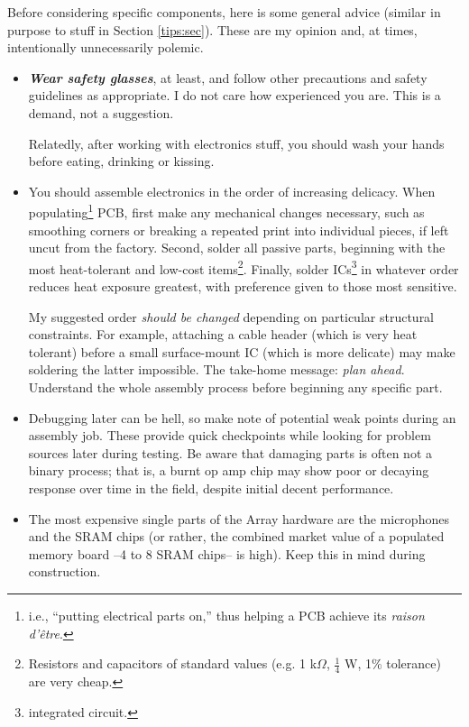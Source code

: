 \documentclass[letterpaper]{article}
\begin{document}
Before considering specific components, here is some general advice
(similar in purpose to stuff in Section \ref{tips:sec}). These are my
opinion and, at times, intentionally unnecessarily polemic.
\begin{itemize}
\item {\large \textbf{\textit{Wear safety glasses}}, at least, and
  follow other precautions and safety guidelines as appropriate.} I do
  not care how experienced you are. This is a demand, not a suggestion.

Relatedly, after working with electronics stuff, you should wash your
hands before eating, drinking or kissing.

\item You should assemble electronics in the order of increasing
  delicacy. When populating\footnote{i.e., ``putting electrical parts
    on,'' thus helping a PCB achieve its \textit{raison d'\^etre}.}
  PCB, first make any mechanical changes necessary, such as smoothing
  corners or breaking a repeated print into individual pieces, if left
  uncut from the factory. Second, solder all passive parts, beginning
  with the most heat-tolerant and low-cost items\footnote{Resistors
    and capacitors of standard values (e.g. 1 k$\Omega$, $\frac{1}{4}$
    W, 1\% tolerance) are very cheap.}. Finally, solder
  ICs\footnote{integrated circuit.} in whatever order reduces heat
  exposure greatest, with preference given to those most sensitive.

My suggested order \textit{should be changed} depending on particular
structural constraints. For example, attaching a cable header (which
is very heat tolerant) before a small surface-mount IC (which is more
delicate) may make soldering the latter impossible. The take-home
message: \textit{plan ahead}. Understand the whole assembly process
before beginning any specific part.

\item Debugging later can be hell, so make note of potential weak
  points during an assembly job. These provide quick checkpoints while
  looking for problem sources later during testing. Be aware that
  damaging parts is often not a binary process; that is, a burnt op
  amp chip may show poor or decaying response over time in the field,
  despite initial decent performance.

\item The most expensive single parts of the Array hardware are the
  microphones and the SRAM chips (or rather, the combined market value
  of a populated memory board --4 to 8 SRAM chips-- is high). Keep
  this in mind during construction.


\end{itemize}
\end{document}
